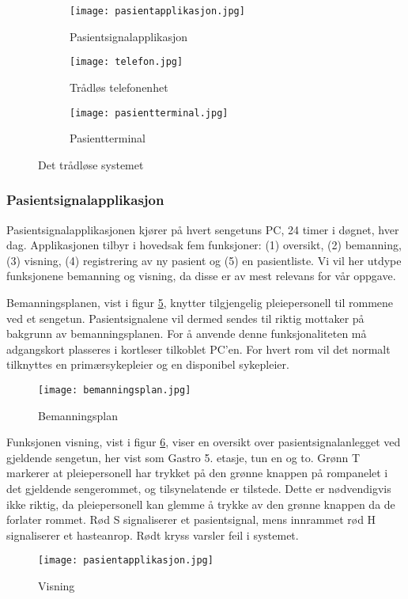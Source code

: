\begin{figure}[H]
        \centering
        \begin{subfigure}[b]{0.35\textwidth}
        		\centering
                \texttt{[image: pasientapplikasjon.jpg]}
                \caption{Pasientsignalapplikasjon}
                \label{pasientapplikasjon}
        \end{subfigure}
        \begin{subfigure}[b]{0.35\textwidth}
        		\centering
                \texttt{[image: telefon.jpg]}
                \caption{Trådløs telefonenhet}
                \label{telefonenhet}
        \end{subfigure}
        \begin{subfigure}[b]{0.25\textwidth}
        		\centering
                \texttt{[image: pasientterminal.jpg]}
                \caption{Pasientterminal}
                \label{pasientterminal}
        \end{subfigure}
        \caption{Det trådløse systemet}\label{dettradlosesystemet}
\end{figure}

\subsubsection{Pasientsignalapplikasjon}
Pasientsignalapplikasjonen kjører på hvert sengetuns PC, 24 timer i døgnet, hver dag. Applikasjonen tilbyr i hovedsak fem funksjoner: (1) oversikt, (2) bemanning, (3) visning, (4) registrering av ny pasient og (5) en pasientliste. Vi vil her utdype funksjonene bemanning og visning, da disse er av mest relevans for vår oppgave.  

\noindent
Bemanningsplanen, vist i figur \ref{bemanningsplan}, knytter tilgjengelig pleiepersonell til rommene ved et sengetun. Pasientsignalene vil dermed sendes til riktig mottaker på bakgrunn av bemanningsplanen. For å anvende denne funksjonaliteten må adgangskort plasseres i kortleser tilkoblet PC'en. For hvert rom vil det normalt tilknyttes en primærsykepleier og en disponibel sykepleier.
\begin{figure}[H]
\centering
\texttt{[image: bemanningsplan.jpg]}
\caption{Bemanningsplan}
\label{bemanningsplan}
\end{figure}
\noindent
Funksjonen visning, vist i figur \ref{visning}, viser en oversikt over pasientsignalanlegget ved gjeldende sengetun, her vist som Gastro 5. etasje, tun en og to. Grønn T markerer at pleiepersonell har trykket på den grønne knappen på rompanelet i det gjeldende sengerommet, og tilsynelatende er tilstede. Dette er nødvendigvis ikke riktig, da pleiepersonell kan glemme å trykke av den grønne knappen da de forlater rommet. Rød S signaliserer et pasientsignal, mens innrammet rød H signaliserer et hasteanrop. Rødt kryss varsler feil i systemet.
\begin{figure}[H]
\centering
\texttt{[image: pasientapplikasjon.jpg]}
\caption{Visning}
\label{visning}
\end{figure}
